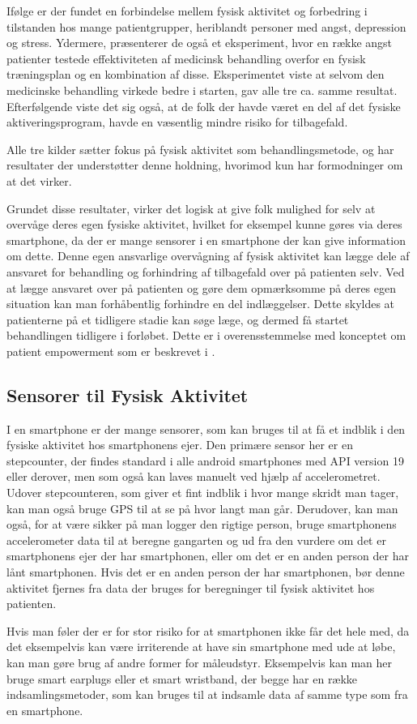 Ifølge \citet{book:sportPsyc} er der fundet en forbindelse mellem fysisk aktivitet og forbedring i tilstanden hos mange patientgrupper, heriblandt personer med angst, depression og stress.
Ydermere, præsenterer de også et eksperiment, hvor en række angst patienter testede effektiviteten af medicinsk behandling overfor en fysisk træningsplan og en kombination af disse.
Eksperimentet viste at selvom den medicinske behandling virkede bedre i starten, gav alle tre ca. samme resultat.
Efterfølgende viste det sig også, at de folk der havde været en del af det fysiske aktiveringsprogram, havde en væsentlig mindre risiko for tilbagefald.

Alle tre kilder sætter fokus på fysisk aktivitet som behandlingsmetode, \citet{art:physMental} og \citet{book:sportPsyc} har resultater der understøtter denne holdning, hvorimod \citet{misc:healthReports} kun har formodninger om at det virker.

Grundet disse resultater, virker det logisk at give folk mulighed for selv at overvåge deres egen fysiske aktivitet, hvilket for eksempel kunne gøres via deres smartphone, da der er mange sensorer i en smartphone der kan give information om dette.
Denne egen ansvarlige overvågning af fysisk aktivitet kan lægge dele af ansvaret for behandling og forhindring af tilbagefald over på patienten selv.
Ved at lægge ansvaret over på patienten og gøre dem opmærksomme på deres egen situation kan man forhåbentlig forhindre en del indlæggelser.
Dette skyldes at patienterne på et tidligere stadie kan søge læge, og dermed få startet behandlingen tidligere i forløbet.
Dette er i overensstemmelse med konceptet om patient empowerment som er beskrevet i \citep[Kapitel 1, Sektion 6.1]{misc:faellesrapp}. 

\subsection{Sensorer til Fysisk Aktivitet}
I en smartphone er der mange sensorer, som kan bruges til at få et indblik i den fysiske aktivitet hos smartphonens ejer.
Den primære sensor her er en stepcounter, der findes standard i alle android smartphones med API version 19 eller derover, men som også kan laves manuelt ved hjælp af accelerometret.
Udover stepcounteren, som giver et fint indblik i hvor mange skridt man tager, kan man også bruge GPS til at se på hvor langt man går.
Derudover, kan man også, for at være sikker på man logger den rigtige person, bruge smartphonens accelerometer data til at beregne gangarten \citep{4272626} og ud fra den vurdere om det er smartphonens ejer der har smartphonen, eller om det er en anden person der har lånt smartphonen.
Hvis det er en anden person der har smartphonen, bør denne aktivitet fjernes fra data der bruges for beregninger til fysisk aktivitet hos patienten.

Hvis man føler der er for stor risiko for at smartphonen ikke får det hele med, da det eksempelvis kan være irriterende at have sin smartphone med ude at løbe, kan man gøre brug af andre former for måleudstyr.
Eksempelvis kan man her bruge smart earplugs eller et smart wristband, der begge har en række indsamlingsmetoder, som kan bruges til at indsamle data af samme type som fra en smartphone.